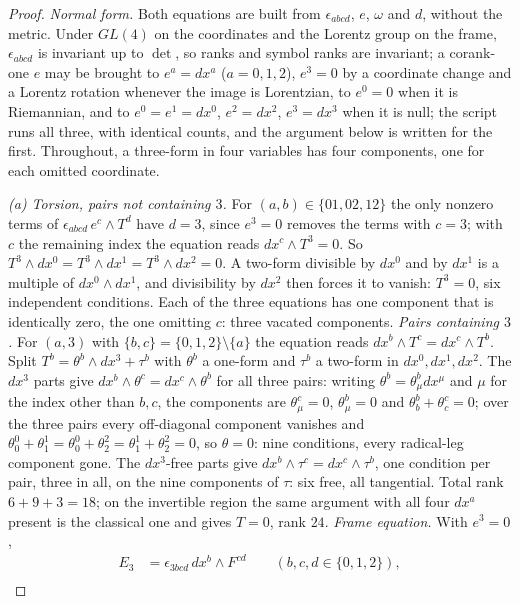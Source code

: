 \documentclass[11pt]{article}
\theoremstyle{definition}
\begin{document}
\begin{proof}
\emph{Normal form.} Both equations are built from $\epsilon_{abcd}$, $e$, $\omega$ and $d$, without the metric. Under $GL(4)$ on the coordinates and the Lorentz group on the frame, $\epsilon_{abcd}$ is invariant up to $\det$, so ranks and symbol ranks are invariant; a corank-one $e$ may be brought to $e^a = dx^a$ ($a = 0,1,2$), $e^3 = 0$ by a coordinate change and a Lorentz rotation whenever the image is Lorentzian, to $e^0 = 0$ when it is Riemannian, and to $e^0 = e^1 = dx^0$, $e^2 = dx^2$, $e^3 = dx^3$ when it is null; the script runs all three, with identical counts, and the argument below is written for the first. Throughout, a three-form in four variables has four components, one for each omitted coordinate.

\emph{(a) Torsion, pairs not containing $3$.} For $(a,b) \in \{01, 02, 12\}$ the only nonzero terms of $\epsilon_{abcd}\,e^c\wedge T^d$ have $d = 3$, since $e^3 = 0$ removes the terms with $c = 3$; with $c$ the remaining index the equation reads $dx^c\wedge T^3 = 0$. So $T^3\wedge dx^0 = T^3\wedge dx^1 = T^3\wedge dx^2 = 0$. A two-form divisible by $dx^0$ and by $dx^1$ is a multiple of $dx^0\wedge dx^1$, and divisibility by $dx^2$ then forces it to vanish: $T^3 = 0$, six independent conditions. Each of the three equations has one component that is identically zero, the one omitting $c$: three vacated components. \emph{Pairs containing $3$.} For $(a, 3)$ with $\{b, c\} = \{0,1,2\}\setminus\{a\}$ the equation reads $dx^b\wedge T^c = dx^c\wedge T^b$. Split $T^b = \theta^b\wedge dx^3 + \tau^b$ with $\theta^b$ a one-form and $\tau^b$ a two-form in $dx^0, dx^1, dx^2$. The $dx^3$ parts give $dx^b\wedge\theta^c = dx^c\wedge\theta^b$ for all three pairs: writing $\theta^b = \theta^b_\mu dx^\mu$ and $\mu$ for the index other than $b, c$, the components are $\theta^c_\mu = 0$, $\theta^b_\mu = 0$ and $\theta^b_b + \theta^c_c = 0$; over the three pairs every off-diagonal component vanishes and $\theta^0_0 + \theta^1_1 = \theta^0_0 + \theta^2_2 = \theta^1_1 + \theta^2_2 = 0$, so $\theta = 0$: nine conditions, every radical-leg component gone. The $dx^3$-free parts give $dx^b\wedge\tau^c = dx^c\wedge\tau^b$, one condition per pair, three in all, on the nine components of $\tau$: six free, all tangential. Total rank $6 + 9 + 3 = 18$; on the invertible region the same argument with all four $dx^a$ present is the classical one and gives $T = 0$, rank $24$. \emph{Frame equation.} With $e^3 = 0$,
\[
\begin{aligned}
E_3 &= \epsilon_{3bcd}\,dx^b\wedge F^{cd} \qquad (b,c,d \in \{0,1,2\}),\\

\end{aligned}\]
\end{proof}
\end{document}
